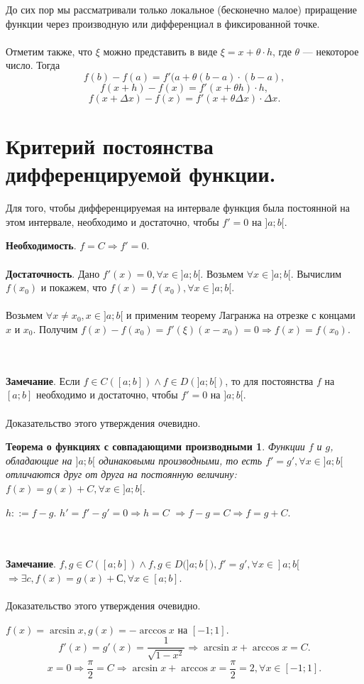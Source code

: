 До сих пор мы рассматривали только локальное (бесконечно малое) приращение функции через производную или дифференциал в фиксированной точке.\\\\
Отметим также, что $\xi$ можно представить в виде $\xi = x + \theta \cdot h$, где $\theta$ --- некоторое число.
Тогда
$$f(b) - f(a) = f'(a + \theta (b - a) \cdot (b - a),$$
$$
f(x + h) - f(x) = f'(x + \theta h) \cdot h,$$
$$
f(x + \Delta x) - f(x) = f'(x + \theta \Delta x)\cdot \Delta x.$$
\section{Критерий постоянства дифференцируемой функции.}
\begin{theorem}
	Для того, чтобы дифференцируемая на интервале функция была постоянной на этом интервале, необходимо и достаточно, чтобы $f'=0$ на $]a;b[$.
\end{theorem}
\begin{Proof} 
	\textbf{Необходимость}. $f = C \Rightarrow f' = 0$. \\\\
	\textbf{Достаточность}.
	Дано $f'(x)=0, \forall x \in ]a;b[$. Возьмем $\forall x \in ]a;b[$. Вычислим $f(x_0)$ и покажем, что $f(x) = f(x_0), \forall x \in ]a;b[$.\\\\
	Возьмем $\forall x \neq x_0, x \in ]a; b[$ и применим теорему Лагранжа на отрезке с концами $x$ и $x_0$. Получим $f(x)- f(x_0) = f'(\xi)(x- x_0) = 0 \Rightarrow f(x) = f(x_0)$.
\end{Proof}\\\\
\textbf{Замечание}. Если $f \in C([a;b]) \wedge f \in D(]a;b[)$, то для постоянства $f$ на $[a;b]$ необходимо и достаточно, чтобы 
$f'=0$ на $]a;b[$.\\\\ Доказательство этого утверждения очевидно.
\newtheorem*{thofs}{Теорема о функциях с совпадающими производными}
\begin{thofs}
	Функции $f$ и $g$, обладающие на $]a;b[$ одинаковыми производными, то есть $f'=g', \forall x \in ]a;b[$ отличаются друг от друга на постоянную величину: $f(x) = g(x) + C, \forall x \in ]a;b[$.
\end{thofs}
\begin{Proof}
	$h::=f-g$. $h'= f'-g'=0 \Rightarrow h = C$
	$\Rightarrow f-g=C \Rightarrow f= g+C.$
\end{Proof}\\\\
\textbf{Замечание}. $f, g\in C([a;b]) \wedge f, g \in D(]a;b[), f'=g', \forall x \in ]a;b[$
$ \Rightarrow \exists c, f(x)=g(x)+С, \forall x \in [a;b].$\\\\ Доказательство этого утверждения очевидно.\\
\begin{example}
	$f(x)=\arcsin x, g(x)= -\arccos x$ на $[-1;1]$.
	$$f'(x)=g'(x)=\frac{1}{\sqrt{1-x^2}} \Rightarrow
	\arcsin x + \arccos x = C.$$ $$x = 0 \Rightarrow \frac{\pi}{2} = C \Rightarrow
	\arcsin x + \arccos x = \frac{\pi}{2}=2, \forall x \in [-1;1].$$
\end{example}
